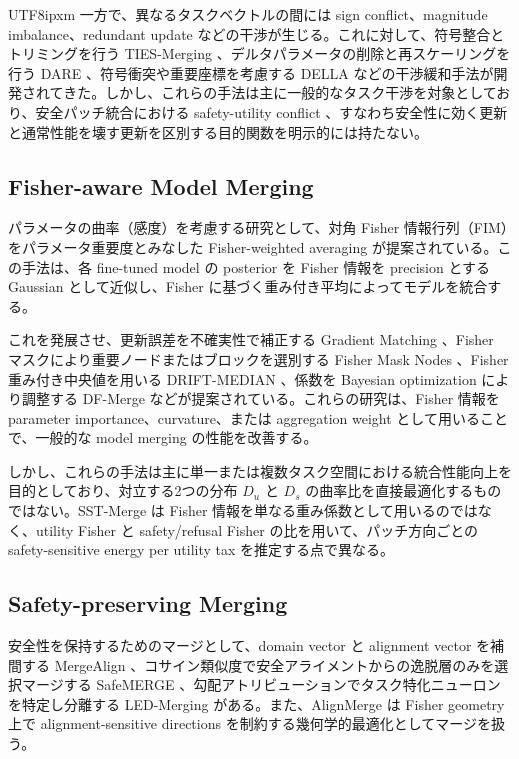 \documentclass[letterpaper]{article} %
\begin{document}
\begin{CJK*}{UTF8}{ipxm}
一方で、異なるタスクベクトルの間には sign conflict、magnitude imbalance、redundant update などの干渉が生じる。これに対して、符号整合とトリミングを行う TIES-Merging \citep{yadav2023ties}、デルタパラメータの削除と再スケーリングを行う DARE \citep{yu2024language}、符号衝突や重要座標を考慮する DELLA \citep{deep2024della} などの干渉緩和手法が開発されてきた。しかし、これらの手法は主に一般的なタスク干渉を対象としており、安全パッチ統合における safety-utility conflict 、すなわち安全性に効く更新と通常性能を壊す更新を区別する目的関数を明示的には持たない。

\subsection{Fisher-aware Model Merging}
パラメータの曲率（感度）を考慮する研究として、対角 Fisher 情報行列（FIM）をパラメータ重要度とみなした Fisher-weighted averaging \citep{matena2022merging} が提案されている。この手法は、各 fine-tuned model の posterior を Fisher 情報を precision とする Gaussian として近似し、Fisher に基づく重み付き平均によってモデルを統合する。

これを発展させ、更新誤差を不確実性で補正する Gradient Matching \citep{daheim2023matching}、Fisher マスクにより重要ノードまたはブロックを選別する Fisher Mask Nodes \citep{thennal2024fisher}、Fisher 重み付き中央値を用いる DRIFT-MEDIAN \citep{baban2025drift}、係数を Bayesian optimization により調整する DF-Merge \citep{sanwoo2025dynamic} などが提案されている。これらの研究は、Fisher 情報を parameter importance、curvature、または aggregation weight として用いることで、一般的な model merging の性能を改善する。

しかし、これらの手法は主に単一または複数タスク空間における統合性能向上を目的としており、対立する2つの分布 $D_u$ と $D_s$ の曲率比を直接最適化するものではない。SST-Merge は Fisher 情報を単なる重み係数として用いるのではなく、utility Fisher と safety/refusal Fisher の比を用いて、パッチ方向ごとの safety-sensitive energy per utility tax を推定する点で異なる。

\subsection{Safety-preserving Merging}
安全性を保持するためのマージとして、domain vector と alignment vector を補間する MergeAlign \citep{hammoud2024mergealign}、コサイン類似度で安全アライメントからの逸脱層のみを選択マージする SafeMERGE \citep{djuhera2025safemerge}、勾配アトリビューションでタスク特化ニューロンを特定し分離する LED-Merging \citep{ma2025led} がある。また、AlignMerge \citep{wang2025alignmerge} は Fisher geometry 上で alignment-sensitive directions を制約する幾何学的最適化としてマージを扱う。


\end{CJK*}
\end{document}
